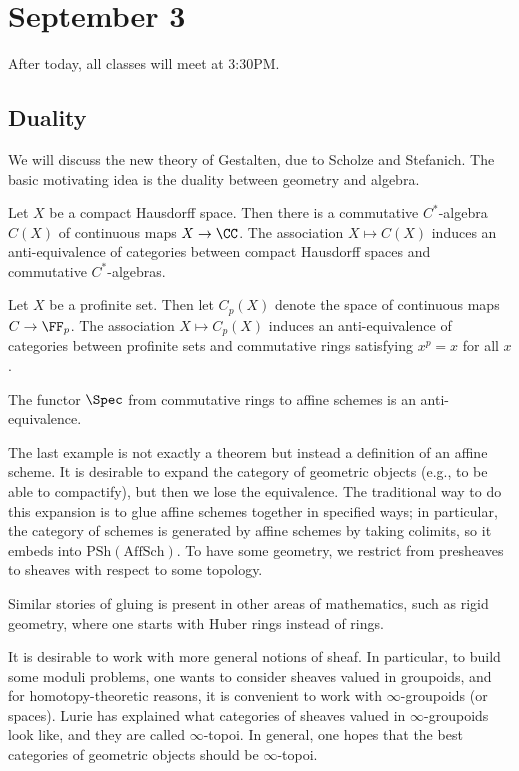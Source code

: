 \documentclass[../notes.tex]{subfiles}
\begin{document}
\section{September 3}
After today, all classes will meet at 3:30PM.

\subsection{Duality}
We will discuss the new theory of Gestalten, due to Scholze and Stefanich. The basic motivating idea is the duality between geometry and algebra.
\begin{example}[Gelfand]
	Let $X$ be a compact Hausdorff space. Then there is a commutative $C^*$-algebra $C(X)$ of continuous maps $X\to\CC$. The association $X\mapsto C(X)$ induces an anti-equivalence of categories between compact Hausdorff spaces and commutative $C^*$-algebras.
\end{example}
\begin{example}[Stone]
	Let $X$ be a profinite set. Then let $C_p(X)$ denote the space of continuous maps $C\to\FF_p$. The association $X\mapsto C_p(X)$ induces an anti-equivalence of categories between profinite sets and commutative rings satisfying $x^p=x$ for all $x$.
\end{example}
\begin{example}[Grothendieck]
	The functor $\Spec$ from commutative rings to affine schemes is an anti-equivalence.
\end{example}
The last example is not exactly a theorem but instead a definition of an affine scheme. It is desirable to expand the category of geometric objects (e.g., to be able to compactify), but then we lose the equivalence. The traditional way to do this expansion is to glue affine schemes together in specified ways; in particular, the category of schemes is generated by affine schemes by taking colimits, so it embeds into $\mathrm{PSh}(\mathrm{AffSch})$. To have some geometry, we restrict from presheaves to sheaves with respect to some topology.
\begin{remark}
	Similar stories of gluing is present in other areas of mathematics, such as rigid geometry, where one starts with Huber rings instead of rings.
\end{remark}
\begin{remark}
	It is desirable to work with more general notions of sheaf. In particular, to build some moduli problems, one wants to consider sheaves valued in groupoids, and for homotopy-theoretic reasons, it is convenient to work with $\infty$-groupoids (or spaces). Lurie has explained what categories of sheaves valued in $\infty$-groupoids look like, and they are called $\infty$-topoi. In general, one hopes that the best categories of geometric objects should be $\infty$-topoi.
\end{remark}
\end{document}
